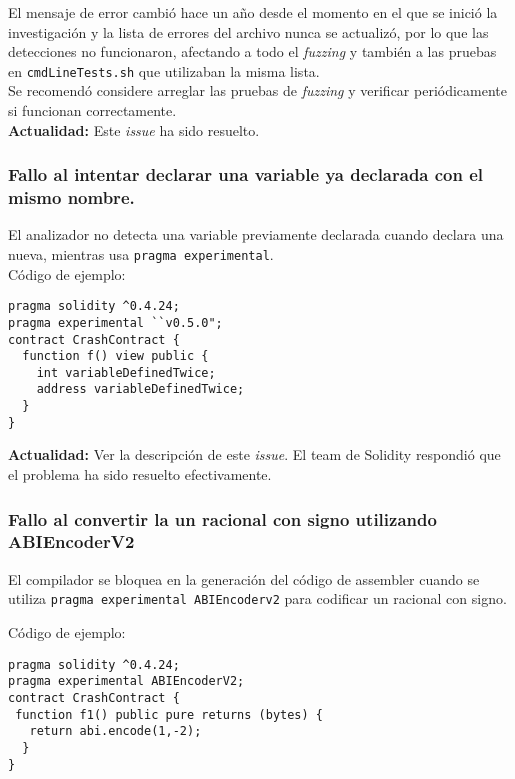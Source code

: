 El mensaje de error cambió hace un año desde el momento en el que se inició la investigación y la lista de errores del archivo nunca se actualizó, por lo que las detecciones no funcionaron, afectando a todo el \textit{fuzzing} y también a las pruebas en \texttt{cmdLineTests.sh}\cite{GHcmdlinetests} que utilizaban la misma lista.\\

Se recomendó considere arreglar las pruebas de \textit{fuzzing} y verificar periódicamente si funcionan correctamente.\\

\textbf{Actualidad:} Este \textit{issue}\cite{GHI4458} ha sido resuelto\cite{GHPR4461}.\\


\subsubsection{Fallo al intentar declarar una variable ya declarada con el mismo nombre.}

El analizador no detecta una variable previamente declarada cuando declara una nueva, mientras usa \texttt{pragma experimental}.\\

Código de ejemplo:
\begin{lstlisting}[language=Solidity]
pragma solidity ^0.4.24;
pragma experimental ``v0.5.0";
contract CrashContract {     
  function f() view public {
    int variableDefinedTwice;
    address variableDefinedTwice;
  }
}
\end{lstlisting}

\textbf{Actualidad:} Ver la descripción de este \textit{issue}\cite{GHI4705}. El team de Solidity respondió que el problema ha sido resuelto efectivamente.\\

\subsubsection{Fallo al convertir la un racional con signo utilizando ABIEncoderV2}

El compilador se bloquea en la generación del código de assembler cuando se utiliza \texttt{pragma experimental ABIEncoderv2} para codificar un racional con signo.

Código de ejemplo:
\begin{lstlisting}[language=Solidity]
pragma solidity ^0.4.24;
pragma experimental ABIEncoderV2;
contract CrashContract {
 function f1() public pure returns (bytes) {
   return abi.encode(1,-2);
  }
}
\end{lstlisting}

